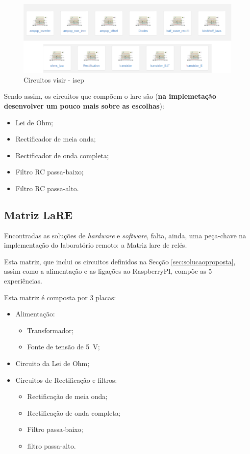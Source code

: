\begin{figure}[hbtp]
    \centering
    \includegraphics[width=1\textwidth]{figures/visir_ISEP.png}
    \caption{Circuitos \acrshort{visir} - \acrshort{isep}}
    \label{fig:circuitosvisir}
\end{figure}

Sendo assim, os circuitos que compõem o \acrshort{lare} são (\textbf{na implemetação desenvolver um pouco mais sobre as escolhas}):
\begin{itemize}
    \item Lei de Ohm; 
    \item Rectificador de meia onda;
    \item Rectificador de onda completa;
    \item Filtro RC passa-baixo;
    \item Filtro RC passa-alto.
\end{itemize}

\subsection{Matriz LaRE}
Encontradas as soluções de \textit{hardware} e \textit{software}, falta, ainda, uma peça-chave na implementação do \acrshort{laboratório remoto}: a Matriz \acrshort{lare} de relés.

Esta matriz, que inclui os circuitos definidos na Secção \ref{sec:solucaoproposta}, assim como a alimentação e as ligações ao \gls{RaspberryPI}, compõe as 5 experiências.

Esta matriz é composta por 3 placas:
\begin{itemize}
    \item Alimentação:
    \begin{itemize}
        \item Transformador;
        \item Fonte de tensão de \SI{5}{\volt};
    \end{itemize}
    \item Circuito da Lei de Ohm;
    \item Circuitos de Rectificação e filtros:
    \begin{itemize}
        \item Rectificação de meia onda;
        \item Rectificação de onda completa;
        \item Filtro passa-baixo;
        \item filtro passa-alto.
    \end{itemize}
\end{itemize}

